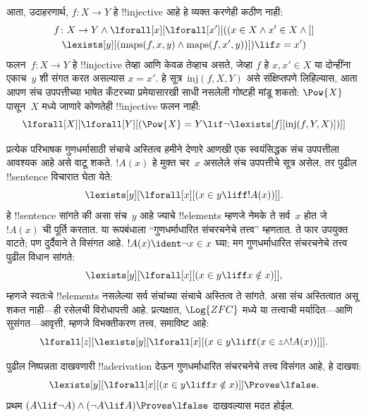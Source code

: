 \documentclass[../../../include/open-logic-section]{subfiles}
\begin{document}
आता, उदाहरणार्थ, $f\colon X \to Y$ हे !!{injective} आहे हे व्यक्त करणेही
कठीण नाही:
\begin{multline*}
 f \colon X \to Y \land \lforall[x][\lforall[x'][((x \in X \land x' \in
     X \land {}]] \\
 \lexists[y][(\mathrm{maps}(f, x, y) \land \mathrm{maps}(f,
        x', y))]) \lif x = x')
\end{multline*}
फलन~$f\colon X \to Y$ हे !!{injective} तेव्हा आणि केवळ तेव्हाच असते, जेव्हा
$f$ हे $x, x' \in X$ या दोन्हींना एकाच~$y$ शी संगत करत असल्यास $x = x'$.
हे सूत्र~$\mathrm{inj}(f, X, Y)$ असे संक्षिप्तपणे लिहिल्यास, आता आपण संच
उपपत्तीच्या भाषेत कँटरच्या प्रमेयासारखी साधी नसलेली गोष्टही मांडू शकतो:
$\Pow{X}$ पासून~$X$ मध्ये जाणारे कोणतेही !!{injective} फलन नाही:
\[
\lforall[X][\lforall[Y][(\Pow{X} = Y \lif
    \lnot\lexists[f][\mathrm{inj}(f, Y, X)])]]
\]

प्रत्येक परिभाषक गुणधर्मासाठी संचाचे अस्तित्व हमीने देणारे आणखी एक
स्वयंसिद्धक संच उपपत्तीला आवश्यक आहे असे वाटू शकते. $!A(x)$ हे मुक्त
चर~$x$ असलेले संच उपपत्तीचे सूत्र असेल, तर पुढील !!{sentence} विचारात घेता
येते:
\[
\lexists[y][\lforall[x][(x \in y \liff !A(x))]].
\]
हे !!{sentence} सांगते की असा संच~$y$ आहे ज्याचे !!{element}s म्हणजे नेमके
ते सर्व~$x$ होत जे~$!A(x)$ ची पूर्ति करतात. या रूपबंधाला ``गुणधर्माधारित
संचरचनेचे तत्त्व'' म्हणतात. ते फार उपयुक्त वाटते; पण दुर्दैवाने ते विसंगत
आहे. $!A(x) \ident \lnot x \in x$ घ्या; मग गुणधर्माधारित संचरचनेचे तत्त्व
पुढील विधान सांगते:
\[
\lexists[y][\lforall[x][(x \in y \liff x \notin x)]],
\]
म्हणजे स्वतःचे !!{element}s नसलेल्या सर्व संचांच्या संचाचे अस्तित्व ते
सांगते. असा संच अस्तित्वात असू शकत नाही---ही रसेलची विरोधापत्ती आहे.
प्रत्यक्षात, $\Log{ZFC}$ मध्ये या तत्त्वाची मर्यादित---आणि सुसंगत---आवृत्ती,
म्हणजे विभक्तीकरण तत्त्व, समाविष्ट आहे:
\[
\lforall[z][\lexists[y][\lforall[x][(x \in y \liff (x \in z \land
      !A(x))]]].
\]

\begin{prob}
पुढील निष्पन्नता दाखवणारी !!a{derivation} देऊन गुणधर्माधारित संचरचनेचे
तत्त्व विसंगत आहे, हे दाखवा:
\[
\lexists[y][\lforall[x][(x \in y \liff x \notin x)]] \Proves \lfalse.
\]
प्रथम $(A \lif \lnot A) \land (\lnot A \lif A)
\Proves \lfalse$ दाखवल्यास मदत होईल.
\end{prob}
\end{document}
